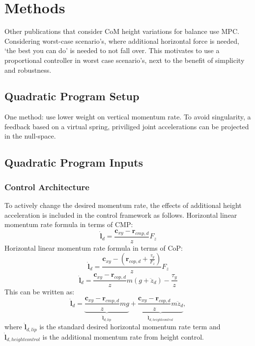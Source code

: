 \section{Methods}
Other publications that consider \ac{CoM} height variations for balance use \ac{MPC}. Considering worst-case scenario's, where additional horizontal force is needed, `the best you can do' is needed to not fall over. This motivates to use a proportional controller in worst case scenario's, next to the benefit of simplicity and robustness.
\subsection{Quadratic Program Setup}
One method: use lower weight on vertical momentum rate. To avoid singularity, a feedback based on a virtual spring, priviliged joint accelerations can be projected in the null-space. 
\subsection{Quadratic Program Inputs}
\subsubsection{Control Architecture}
To actively change the desired momentum rate, the effects of additional height acceleration is included in the control framework as follows. 
Horizontal linear momentum rate formula in terms of \ac{CMP}:
\begin{equation}
\dot{\mathbf{l}}_d=\frac{\mathbf{c}_{xy}-\mathbf{r}_{cmp,d}}{z}F_z
\end{equation}
Horizontal linear momentum rate formula in terms of \ac{CoP}:
\begin{equation}
\dot{\mathbf{l}}_d=\frac{\mathbf{c}_{xy}-(\mathbf{r}_{cop,d}+\frac{\tau_y}{F_z})}{z}F_z
\end{equation}
\begin{equation}
\dot{\mathbf{l}}_d=\frac{\mathbf{c}_{xy}-\mathbf{r}_{cop,d}}{z}m(g+\ddot{z}_d) - \frac{\tau_y}{z}
\end{equation}
 This can be written as:
 \begin{equation}
\dot{\mathbf{l}}_d=\underbrace{ \frac{\mathbf{c}_{xy}-\mathbf{r}_{cmp,d}} {z}mg}_{\dot{\mathbf{l}}_{d,lip}}  + \underbrace{\frac{\mathbf{c}_{xy}-\mathbf{r}_{cop,d}}{z}m\ddot{z}_d}_{\dot{\mathbf{l}}_{d,heightcontrol}},
\end{equation}
where $\dot{\mathbf{l}}_{d,lip}$ is the standard desired horizontal momentum rate term and $\dot{\mathbf{l}}_{d,heightcontrol}$ is the additional momentum rate from height control.
